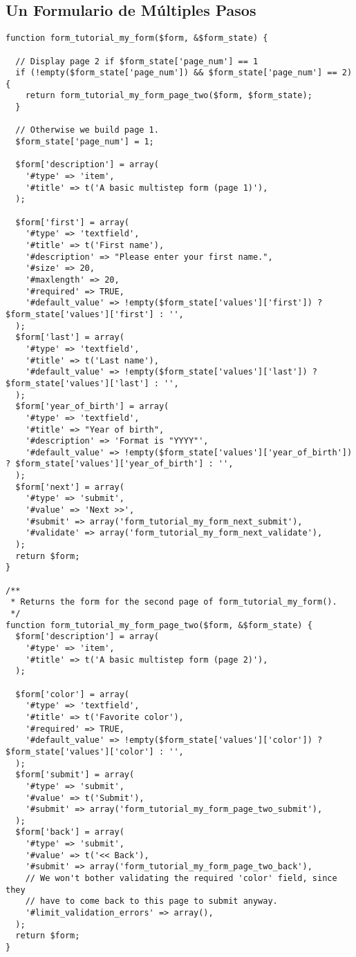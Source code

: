 \documentclass[11pt]{article}
\begin{document}
\subsection{Un Formulario de Múltiples Pasos}
\label{sec-4.10}



\begin{verbatim}
function form_tutorial_my_form($form, &$form_state) {

  // Display page 2 if $form_state['page_num'] == 1
  if (!empty($form_state['page_num']) && $form_state['page_num'] == 2) {
    return form_tutorial_my_form_page_two($form, $form_state);
  }

  // Otherwise we build page 1.
  $form_state['page_num'] = 1;

  $form['description'] = array(
    '#type' => 'item',
    '#title' => t('A basic multistep form (page 1)'),
  );

  $form['first'] = array(
    '#type' => 'textfield',
    '#title' => t('First name'),
    '#description' => "Please enter your first name.",
    '#size' => 20,
    '#maxlength' => 20,
    '#required' => TRUE,
    '#default_value' => !empty($form_state['values']['first']) ? $form_state['values']['first'] : '',
  );
  $form['last'] = array(
    '#type' => 'textfield',
    '#title' => t('Last name'),
    '#default_value' => !empty($form_state['values']['last']) ? $form_state['values']['last'] : '',
  );
  $form['year_of_birth'] = array(
    '#type' => 'textfield',
    '#title' => "Year of birth",
    '#description' => 'Format is "YYYY"',
    '#default_value' => !empty($form_state['values']['year_of_birth']) ? $form_state['values']['year_of_birth'] : '',
  );
  $form['next'] = array(
    '#type' => 'submit',
    '#value' => 'Next >>',
    '#submit' => array('form_tutorial_my_form_next_submit'),
    '#validate' => array('form_tutorial_my_form_next_validate'),
  );
  return $form;
}

/**
 * Returns the form for the second page of form_tutorial_my_form().
 */
function form_tutorial_my_form_page_two($form, &$form_state) {
  $form['description'] = array(
    '#type' => 'item',
    '#title' => t('A basic multistep form (page 2)'),
  );

  $form['color'] = array(
    '#type' => 'textfield',
    '#title' => t('Favorite color'),
    '#required' => TRUE,
    '#default_value' => !empty($form_state['values']['color']) ? $form_state['values']['color'] : '',
  );
  $form['submit'] = array(
    '#type' => 'submit',
    '#value' => t('Submit'),
    '#submit' => array('form_tutorial_my_form_page_two_submit'),
  );
  $form['back'] = array(
    '#type' => 'submit',
    '#value' => t('<< Back'),
    '#submit' => array('form_tutorial_my_form_page_two_back'),
    // We won't bother validating the required 'color' field, since they
    // have to come back to this page to submit anyway.
    '#limit_validation_errors' => array(),
  );
  return $form;
}



\end{verbatim}
\end{document}
